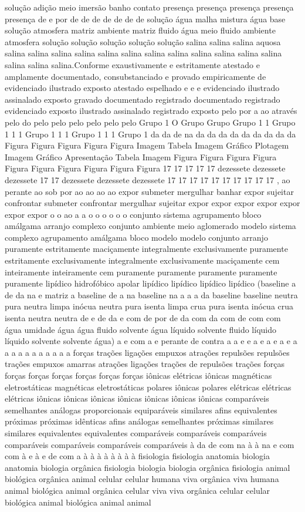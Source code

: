 solução adição meio imersão banho contato presença presença presença presença presença de e por de de de de de de de solução água malha mistura água base solução atmosfera matriz ambiente matriz fluido água meio fluido ambiente atmosfera solução solução solução solução solução salina salina salina aquosa salina salina salina salina salina salina salina salina salina salina salina salina salina salina salina.Conforme exaustivamente e estritamente atestado e amplamente documentado, consubstanciado e provado empiricamente de evidenciado ilustrado exposto atestado espelhado e e e evidenciado ilustrado assinalado exposto gravado documentado registrado documentado registrado evidenciado exposto ilustrado assinalado registrado exposto pelo por a ao através pelo do pelo pelo pelo pelo pelo pelo Grupo 1 O Grupo Grupo Grupo 1 1 Grupo 1 1 1 Grupo 1 1 1 Grupo 1 1 1 Grupo 1 da da de na da da da da da da da da da Figura Figura Figura Figura Figura Imagem Tabela Imagem Gráfico Plotagem Imagem Gráfico Apresentação Tabela Imagem Figura Figura Figura Figura Figura Figura Figura Figura Figura Figura 17 17 17 17 17 dezessete dezessete dezessete 17 17 dezessete dezessete dezessete 17 17 17 17 17 17 17 17 17 17 , ao perante ao sob por ao ao ao ao expor submeter mergulhar banhar expor sujeitar confrontar submeter confrontar mergulhar sujeitar expor expor expor expor expor expor expor o o ao a a o o o o o o conjunto sistema agrupamento bloco amálgama arranjo complexo conjunto ambiente meio aglomerado modelo sistema complexo agrupamento amálgama bloco modelo modelo conjunto arranjo puramente estritamente maciçamente integralmente exclusivamente puramente estritamente exclusivamente integralmente exclusivamente maciçamente cem inteiramente inteiramente cem puramente puramente puramente puramente puramente lipídico hidrofóbico apolar lipídico lipídico lipídico lipídico (baseline a de da na e matriz a baseline de a na baseline na a a a da baseline baseline neutra pura neutra limpa inócua neutra pura isenta limpa crua pura isenta inócua crua isenta neutra neutra de e de da e com de por de da com da com de com com água umidade água água fluido solvente água líquido solvente fluido líquido líquido solvente solvente água) a e com a e perante de contra a a e e a e a e a e a a a a a a a a a a a forças trações ligações empuxos atrações repulsões repulsões trações empuxos amarras atrações ligações trações de repulsões trações forças forças forças forças forças forças forças iônicas elétricas iônicas magnéticas eletrostáticas magnéticas eletrostáticas polares iônicas polares elétricas elétricas elétricas iônicas iônicas iônicas iônicas iônicas iônicas iônicas comparáveis semelhantes análogas proporcionais equiparáveis similares afins equivalentes próximas próximas idênticas afins análogas semelhantes próximas similares similares equivalentes equivalentes comparáveis comparáveis comparáveis comparáveis comparáveis comparáveis comparáveis à da de com na à à na e com com à e à e de com a à à à à à à à à fisiologia fisiologia anatomia biologia anatomia biologia orgânica fisiologia biologia biologia orgânica fisiologia animal biológica orgânica animal celular celular humana viva orgânica viva humana animal biológica animal orgânica celular viva viva orgânica celular celular biológica animal biológica animal animal 